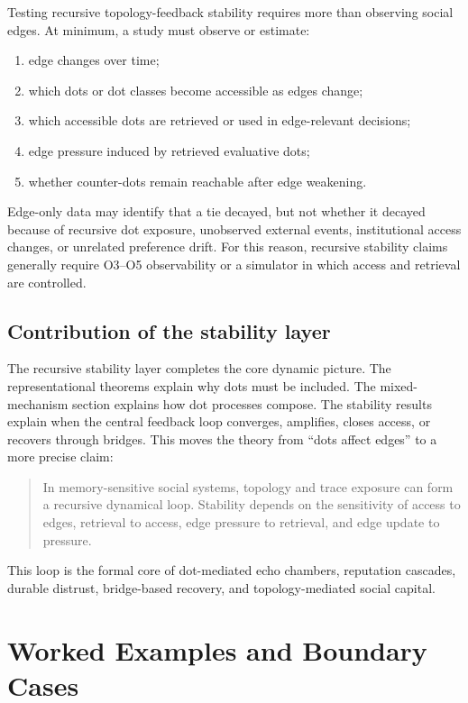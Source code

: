 \documentclass[11pt]{article}
\theoremstyle{remark}
\begin{document}
Testing recursive topology-feedback stability requires more than observing social edges. At minimum, a study must observe or estimate:

\begin{enumerate}[leftmargin=*]
\item edge changes over time;
\item which dots or dot classes become accessible as edges change;
\item which accessible dots are retrieved or used in edge-relevant decisions;
\item edge pressure induced by retrieved evaluative dots;
\item whether counter-dots remain reachable after edge weakening.
\end{enumerate}

Edge-only data may identify that a tie decayed, but not whether it decayed because of recursive dot exposure, unobserved external events, institutional access changes, or unrelated preference drift. For this reason, recursive stability claims generally require O3--O5 observability or a simulator in which access and retrieval are controlled.

\subsection{Contribution of the stability layer}\label{contribution-stability-layer}

The recursive stability layer completes the core dynamic picture. The representational theorems explain why dots must be included. The mixed-mechanism section explains how dot processes compose. The stability results explain when the central feedback loop converges, amplifies, closes access, or recovers through bridges. This moves the theory from ``dots affect edges'' to a more precise claim:

\begin{quote}
In memory-sensitive social systems, topology and trace exposure can form a recursive dynamical loop. Stability depends on the sensitivity of access to edges, retrieval to access, edge pressure to retrieval, and edge update to pressure.
\end{quote}

This loop is the formal core of dot-mediated echo chambers, reputation cascades, durable distrust, bridge-based recovery, and topology-mediated social capital.


\section{Worked Examples and Boundary Cases}\label{worked-examples-boundary-cases}
\end{document}
